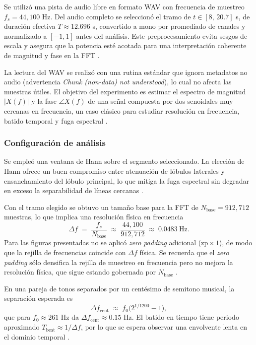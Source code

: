 \documentclass[letter,12pt]{article}
\begin{document}
Se utilizó una pista de audio libre en formato WAV con frecuencia de muestreo \(f_s=44{,}100\) Hz. Del audio completo se seleccionó el tramo de \(t\in[8,\,20.7]\) s, de duración efectiva \(T\approx 12.696\) s, convertido a mono por promediado de canales y normalizado a \([-1,1]\) antes del análisis. Este preprocesamiento evita sesgos de escala y asegura que la potencia esté acotada para una interpretación coherente de magnitud y fase en la FFT \cite{OppenheimSchaferDTSP3e}.  

La lectura del WAV se realizó con una rutina estándar que ignora metadatos no audio (advertencia \emph{Chunk (non-data) not understood}), lo cual no afecta las muestras útiles. El objetivo del experimento es estimar el espectro de magnitud \(|X(f)|\) y la fase \(\angle X(f)\) de una señal compuesta por dos senoidales muy cercanas en frecuencia, un caso clásico para estudiar resolución en frecuencia, batido temporal y fuga espectral \cite{oppenheim2010}.

\subsubsection{Configuración de análisis}

Se empleó una ventana de Hann sobre el segmento seleccionado. La elección de Hann ofrece un buen compromiso entre atenuación de lóbulos laterales y ensanchamiento del lóbulo principal, lo que mitiga la fuga espectral sin degradar en exceso la separabilidad de líneas cercanas \cite{Harris1978Windows}.  

Con el tramo elegido se obtuvo un tamaño base para la FFT de \(N_{\text{base}}=912{,}712\) muestras, lo que implica una resolución física en frecuencia
\[
\Delta f \;=\; \frac{f_s}{N_{\text{base}}} \;\approx\; \frac{44{,}100}{912{,}712}\;\approx\;0.0483\ \text{Hz}.
\]
Para las figuras presentadas no se aplicó \emph{zero padding} adicional (\(\text{zp}\times1\)), de modo que la rejilla de frecuencias coincide con \(\Delta f\) física. Se recuerda que el \emph{zero padding} sólo densifica la rejilla de muestreo en frecuencia pero no mejora la resolución física, que sigue estando gobernada por \(N_{\text{base}}\) \cite{OppenheimSchaferDTSP3e}.  

En una pareja de tonos separados por un centésimo de semitono musical, la separación esperada es
\[
\Delta f_{\text{cent}} \;\approx\; f_0\big(2^{1/1200}-1\big),
\]
que para \(f_0\approx 261\) Hz da \(\Delta f_{\text{cent}}\approx 0.15\) Hz. El batido en tiempo tiene periodo aproximado \(T_{\text{beat}}\approx 1/\Delta f\), por lo que se espera observar una envolvente lenta en el dominio temporal \cite{CooleyTukey1965}.
\end{document}
